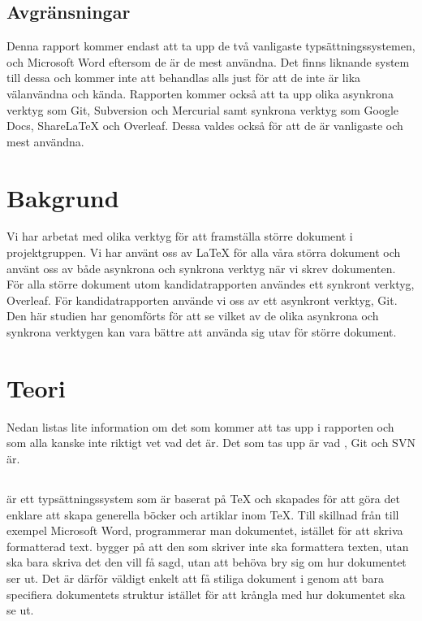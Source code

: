\subsection{Avgränsningar}
Denna rapport kommer endast att ta upp de två vanligaste typsättningssystemen, \latex och Microsoft Word eftersom de är de mest användna. Det finns liknande system till dessa och kommer inte att behandlas alls just för att de inte är lika välanvändna och kända. Rapporten kommer också att ta upp olika asynkrona verktyg som Git, Subversion och Mercurial samt synkrona verktyg som Google Docs, ShareLaTeX och Overleaf. Dessa valdes också för att de är vanligaste och mest användna.

\section{Bakgrund}
\label{sec:background-tuhkala}
Vi har arbetat med olika verktyg för att framställa större dokument i projektgruppen. Vi har använt oss av LaTeX för alla våra störra dokument och använt oss av både asynkrona och synkrona verktyg när vi skrev dokumenten. För alla större dokument utom kandidatrapporten användes ett synkront verktyg, Overleaf. För kandidatrapporten använde vi oss av ett asynkront verktyg, Git. Den här studien har genomförts för att se vilket av de olika asynkrona och synkrona verktygen kan vara bättre att använda sig utav för större dokument. 

\section{Teori}
\label{sec:theory-tuhkala}
Nedan listas lite information om det som kommer att tas upp i rapporten och som alla kanske inte riktigt vet vad det är. Det som tas upp är vad \latex, Git och SVN är.

\subsection{\latex}
\latex är ett typsättningssystem som är baserat på TeX och skapades för att göra det enklare att skapa generella böcker och artiklar inom TeX. Till skillnad från till exempel Microsoft Word, programmerar man dokumentet, istället för att skriva formatterad text. \latex bygger på att den som skriver inte ska formattera texten, utan ska bara skriva det den vill få sagd, utan att behöva bry sig om hur dokumentet ser ut.  Det är därför väldigt enkelt att få stiliga dokument i \latex genom att bara specifiera dokumentets struktur istället för att krångla med hur dokumentet ska se ut.

